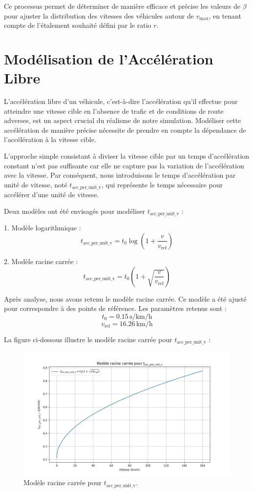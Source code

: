 \documentclass{article}
\begin{document}
Ce processus permet de déterminer de manière efficace et précise les valeurs de \(\beta\) pour ajuster la distribution des vitesses des véhicules autour de \(v_{\text{max}}\), en tenant compte de l'étalement souhaité défini par le ratio \(r\).


\newpage

\section{Modélisation de l'Accélération Libre}

L'accélération libre d'un véhicule, c'est-à-dire l'accélération qu'il effectue pour atteindre une vitesse cible en l'absence de trafic et de conditions de route adverses, est un aspect crucial du réalisme de notre simulation. Modéliser cette accélération de manière précise nécessite de prendre en compte la dépendance de l'accélération à la vitesse cible.

L'approche simple consistant à diviser la vitesse cible par un temps d'accélération constant n'est pas suffisante car elle ne capture pas la variation de l'accélération avec la vitesse. Par conséquent, nous introduisons le temps d'accélération par unité de vitesse, noté \(t_{\text{acc\_per\_unit\_v}}\), qui représente le temps nécessaire pour accélérer d'une unité de vitesse.

Deux modèles ont été envisagés pour modéliser \(t_{\text{acc\_per\_unit\_v}}\) :

1. Modèle logarithmique :
   \[
   t_{\text{acc\_per\_unit\_v}} = t_0 \log\left(1 + \frac{v}{v_{\text{ref}}}\right)
   \]

2. Modèle racine carrée :
   \[
   t_{\text{acc\_per\_unit\_v}} = t_0 \left(1 + \sqrt{\frac{v}{v_{\text{ref}}}}\right)
   \]

Après analyse, nous avons retenu le modèle racine carrée. Ce modèle a été ajusté pour correspondre à des points de référence. Les paramètres retenus sont :
\[
t_0 = 0.15 \, \text{s/km/h}
\]
\[
v_{\text{ref}} = 16.26 \, \text{km/h}
\]

La figure ci-dessous illustre le modèle racine carrée pour \(t_{\text{acc\_per\_unit\_v}}\) :

\begin{figure}[h!]
    \centering
    \includegraphics[width=\textwidth]{sqrt model.png}
    \caption{Modèle racine carrée pour \(t_{\text{acc\_per\_unit\_v}}\).}
    \label{fig:sqrt_model}
\end{figure}
\end{document}
